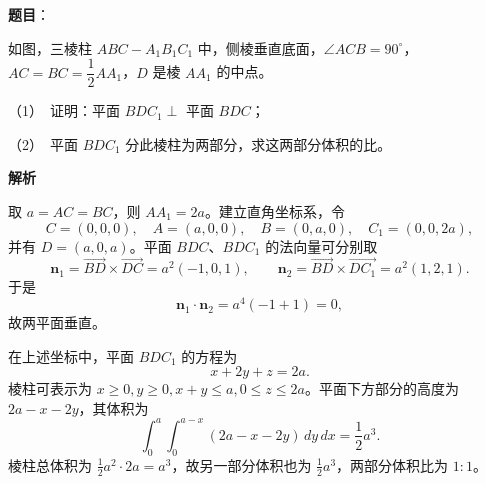 \begin{answer}

\textbf{题目}：

如图，三棱柱 $ABC-A_1B_1C_1$ 中，侧棱垂直底面，$\angle ACB=90^\circ$，$AC=BC=\dfrac12AA_1$，$D$ 是棱 $AA_1$ 的中点。

（1）　证明：平面 $BDC_1\perp$ 平面 $BDC$；

（2）　平面 $BDC_1$ 分此棱柱为两部分，求这两部分体积的比。

\textbf{解析}


取 $a=AC=BC$，则 $AA_1=2a$。建立直角坐标系，令
\nopagebreak[4]
\[
C=(0,0,0),\quad A=(a,0,0),\quad B=(0,a,0),\quad C_1=(0,0,2a),
\]
并有 $D=(a,0,a)$。平面 $BDC$、$BDC_1$ 的法向量可分别取
\nopagebreak[4]
\[
\boldsymbol n_1=\overrightarrow{BD}\times\overrightarrow{DC}=a^2(-1,0,1),
\qquad
\boldsymbol n_2=\overrightarrow{BD}\times\overrightarrow{DC_1}=a^2(1,2,1).
\]
于是
\nopagebreak[4]
\[
\boldsymbol n_1\cdot\boldsymbol n_2=a^4(-1+1)=0,
\]
故两平面垂直。


在上述坐标中，平面 $BDC_1$ 的方程为
\nopagebreak[4]
\[
x+2y+z=2a.
\]
棱柱可表示为 $x\geqslant0,y\geqslant0,x+y\leqslant a,0\leqslant z\leqslant2a$。平面下方部分的高度为 $2a-x-2y$，其体积为
\nopagebreak[4]
\[
\int_0^a\int_0^{a-x}(2a-x-2y)\,dy\,dx=\frac12a^3.
\]
棱柱总体积为 $\frac12a^2\cdot2a=a^3$，故另一部分体积也为 $\frac12a^3$，两部分体积比为 $1:1$。



\end{answer}

